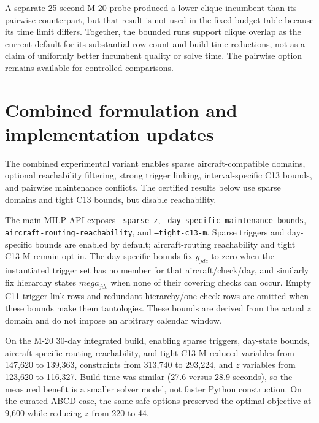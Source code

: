 A separate 25-second M-20 probe produced a lower clique incumbent than its
pairwise counterpart, but that result is not used in the fixed-budget table
because its time limit differs. Together, the bounded runs support clique
overlap as the current default for its substantial row-count and build-time
reductions, not as a claim of uniformly better incumbent quality or solve time.
The pairwise option remains available for controlled comparisons.



\section{Combined formulation and implementation updates}

The combined experimental variant enables sparse aircraft-compatible domains,
optional reachability filtering, strong trigger linking, interval-specific C13
bounds, and pairwise maintenance conflicts. The certified results below use
sparse domains and tight C13 bounds, but disable reachability.

The main MILP API exposes \texttt{--sparse-z},
\texttt{--day-specific-maintenance-bounds},
\texttt{--aircraft-routing-reachability}, and \texttt{--tight-c13-m}. Sparse
triggers and day-specific bounds are enabled by default; aircraft-routing
reachability and tight C13-M remain opt-in. The day-specific bounds fix
$y_{jdc}$ to zero when the instantiated trigger set has
no member for that aircraft/check/day, and similarly fix hierarchy states
$\mathit{mega}_{jdc}$ when none of their covering checks can occur. Empty C11
trigger-link rows and redundant hierarchy/one-check rows are omitted when these
bounds make them tautologies. These bounds are derived from the actual $z$
domain and do not impose an arbitrary calendar window.

On the M-20 30-day integrated build, enabling sparse triggers, day-state bounds,
aircraft-specific routing reachability, and tight C13-M reduced variables from
147{,}620 to 139{,}363, constraints from 313{,}740 to 293{,}224, and $z$
variables from 123{,}620 to 116{,}327. Build time was similar (27.6 versus
28.9 seconds), so the measured benefit is a smaller solver model, not faster
Python construction. On the curated ABCD case, the same safe options preserved
the optimal objective at 9{,}600 while reducing $z$ from 220 to 44.


